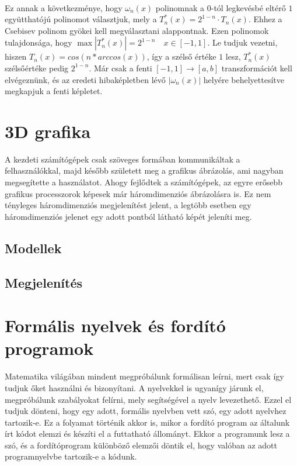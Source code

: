 \documentclass{elteikthesis}
\begin{document}
\paragraph{}
Ez annak a következménye, hogy $\omega_n(x)$ polinomnak a $0$-tól legkevésbé eltérő $1$ együtthatójú polinomot választjuk, mely a $T^*_n(x) = 2^{1-n} \cdot T_n(x)$. Ehhez a Csebisev polinom gyökei kell megválasztani alappontnak. Ezen polinomok tulajdonsága, hogy $\max |T^*_n(x)| = 2^{1-n} \quad x \in [-1,1]$. Le tudjuk vezetni, hiszen $T_n(x) = cos(n*arccos(x))$, így a szélső értéke $1$ lesz, $T^*_n(x)$ szélsőértéke pedig $2^{1-n}$.
Már csak a fenti $[-1,1] \rightarrow [a,b]$ transzformációt kell elvégeznünk, és az eredeti hibaképletben lévő $|\omega_n(x)|$ helyére behelyettesítve megkapjuk a fenti képletet.
\newpage
\section{3D grafika}
A kezdeti számítógépek csak szöveges formában kommunikáltak a felhasználókkal, majd később született meg a grafikus ábrázolás, ami nagyban megsegítette a használatot. Ahogy fejlődtek a számítógépek, az egyre erősebb grafikus processzorok képesek már háromdimenziós ábrázolásra is. Ez nem tényleges háromdimenziós megjelenítést jelent, a legtöbb esetben egy háromdimenziós jelenet egy adott pontból látható képét jeleníti meg.
\subsection{Modellek}

\subsection{Megjelenítés}
\newpage
\section{Formális nyelvek és fordító programok}
Matematika világában mindent megpróbálunk formálisan leírni, mert csak így tudjuk őket használni és bizonyítani. A nyelvekkel is ugyanígy járunk el, megpróbálunk szabályokat felírni, mely segítségével a nyelv levezethető. Ezzel el tudjuk dönteni, hogy egy adott, formális nyelvben vett szó, egy adott nyelvhez tartozik-e. Ez a folyamat történik akkor is, mikor a fordító program az általunk írt kódot elemzi és készíti el a futtatható állományt. Ekkor a programunk lesz a szó, és a fordítóprogram különböző elemzői döntik el, hogy valóban az adott programnyelvbe tartozik-e a kódunk.
\end{document}
